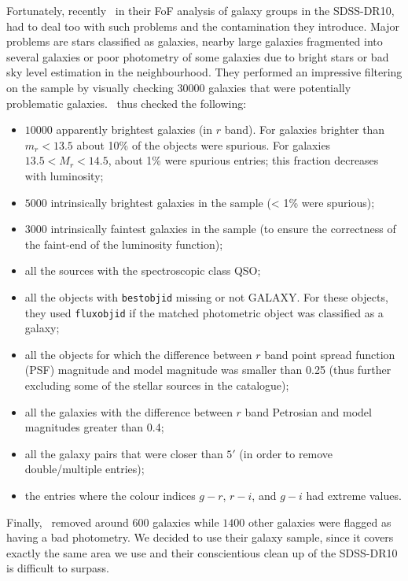 Fortunately, recently~\cite{Tempel+14} in their FoF analysis of galaxy groups
in the SDSS-DR10, had to deal too with such problems and the contamination they
introduce. Major problems are stars classified as galaxies, nearby large
galaxies fragmented into several galaxies or poor photometry of some galaxies
due to bright stars or bad sky level estimation in the neighbourhood. They
performed an impressive filtering on the sample by visually checking 30000
galaxies that were potentially problematic galaxies.~\cite{Tempel+14} thus
checked the following:
%
\begin{itemize}
    \item $10000$ apparently brightest galaxies (in $r$ band). For galaxies
        brighter than $m_r < 13.5$ about 10\% of the objects were spurious. For
        galaxies $13.5 < M_r < 14.5$, about 1\% were spurious entries; this
        fraction decreases with luminosity;
    \item $5000$ intrinsically brightest galaxies in the sample (< 1\% were
        spurious);
    \item $3000$ intrinsically faintest galaxies in the sample (to ensure the
        correctness of the faint-end of the luminosity function);
    \item all the sources with the spectroscopic class QSO\@;
    \item all the objects with \texttt{bestobjid} missing or not GALAXY\@. For
        these objects, they used \texttt{fluxobjid} if the matched photometric
        object was classified as a galaxy;
    \item all the objects for which the difference between $r$ band point
        spread function (PSF) magnitude and model magnitude was smaller than
        0.25 (thus further excluding some of the stellar sources in the
        catalogue);
    \item all the galaxies with the difference between $r$ band Petrosian and
        model magnitudes greater than 0.4;
    \item all the galaxy pairs that were closer than $5'$ (in order to remove
        double/multiple entries);
    \item the entries where the colour indices $g−r$, $r−i$, and $g−i$ had
        extreme values.
\end{itemize}

Finally,~\cite{Tempel+14} removed around $600$ galaxies while $1400$ other
galaxies were flagged as having a bad photometry. We decided to use their
galaxy sample, since it covers exactly the same area we use and their
conscientious clean up of the SDSS-DR10 is difficult to surpass.

